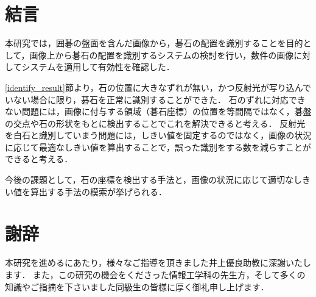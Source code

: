 \documentclass[openright]{nitocs}
\numberwithin{equation}{section}
\begin{document}
    \section{結言}\label{sec:Item} %
        本研究では，囲碁の盤面を含んだ画像から，碁石の配置を識別することを目的として，画像上から碁石の配置を識別するシステムの検討を行い，数件の画像に対してシステムを適用して有効性を確認した．

        \ref{identify_result}節より，石の位置に大きなずれが無い，かつ反射光が写り込んでいない場合に限り，碁石を正常に識別することができた．
        石のずれに対応できない問題には，画像に付与する領域（碁石座標）の位置を等間隔ではなく，碁盤の交点や石の形状をもとに検出することでこれを解決できると考える．
        反射光を白石と識別していまう問題には，しきい値を固定するのではなく，画像の状況に応じて最適なしきい値を算出することで，誤った識別をする数を減らすことができると考える．
        
        今後の課題として，石の座標を検出する手法と，画像の状況に応じて適切なしきい値を算出する手法の模索が挙げられる．

    \section*{謝辞} %
        本研究を進めるにあたり，様々なご指導を頂きました井上優良助教に深謝いたします．
        また，この研究の機会をくださった情報工学科の先生方，そして多くの知識やご指摘を下さいました同級生の皆様に厚く御礼申し上げます．
    
\end{document}
